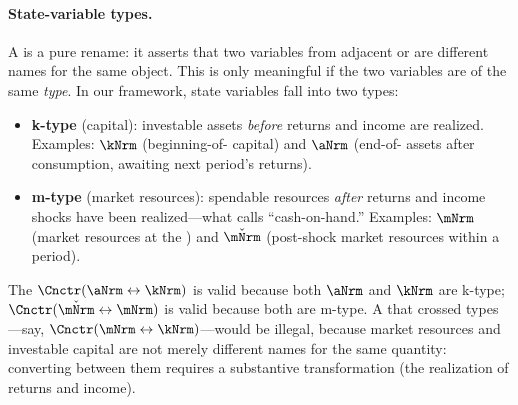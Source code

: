 \hypertarget{state-variable-types}{}
\paragraph{State-variable types.}  A {\Cnct} is a pure rename: it asserts that two variables from adjacent {\stgs} or {\intervals} are different names for the same object.  This is only meaningful if the two variables are of the same \textit{type}.  In our framework, state variables fall into two types:
\begin{itemize}
\item \textbf{k-type} (capital): investable assets \textit{before} returns and income are realized.  Examples: $\kNrm$ (beginning-of-{\interval} capital) and $\aNrm$ (end-of-{\interval} assets after consumption, awaiting next period's returns).
\item \textbf{m-type} (market resources): spendable resources \textit{after} returns and income shocks have been realized---what \citet{deatonUnderstandingC} calls ``cash-on-hand.''  Examples: $\mNrm$ (market resources at the {\Decision} {\prch}) and $\check{\mNrm}$ (post-shock market resources within a period).
\end{itemize}
\noindent The {\Cnct} $\Cnctr(\aNrm \leftrightarrow \kNrm)$ is valid because both $\aNrm$ and $\kNrm$ are k-type; $\Cnctr(\check{\mNrm} \leftrightarrow \mNrm)$ is valid because both are m-type.  A {\Cnct} that crossed types---say, $\Cnctr(\mNrm \leftrightarrow \kNrm)$---would be illegal, because market resources and investable capital are not merely different names for the same quantity: converting between them requires a substantive transformation (the realization of returns and income).

